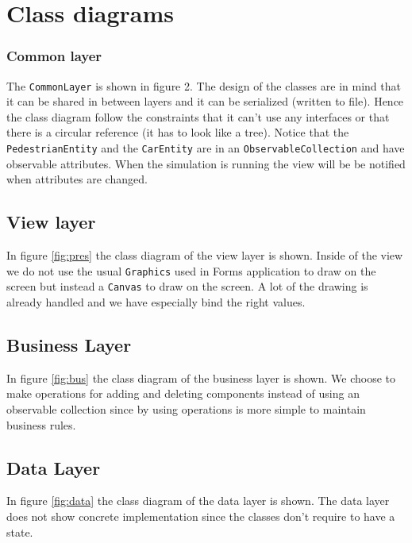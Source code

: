 \section{Class diagrams}
\subsubsection{Common layer}
The \texttt{CommonLayer} is shown in figure 2. The design of the classes are in mind that it can be shared in between layers and it can be serialized (written to file). Hence the class diagram follow the constraints that it can't use any interfaces or that there is a circular reference (it has to look like a tree). Notice that the 
\texttt{PedestrianEntity} and the \texttt{CarEntity} are in an \texttt{ObservableCollection} and have observable attributes. When the simulation is running the view will be be notified when attributes are changed.

\subsection{View layer}
In figure \ref{fig:pres} the class diagram of the view layer is shown. Inside of the view we do not use the usual \texttt{Graphics} used in Forms application to draw on the screen but instead a \texttt{Canvas} to draw on the screen. A lot of the drawing is already handled and we have especially bind the right values.

\subsection{Business Layer}
In figure \ref{fig:bus} the class diagram of the business layer is shown. We choose to make operations for adding and deleting components instead of using an observable collection since by using operations is more simple to maintain business rules. 

\subsection{Data Layer}
In figure \ref{fig:data} the class diagram of the data layer is shown. The data layer does not show concrete implementation since the classes don't require to have a state.

